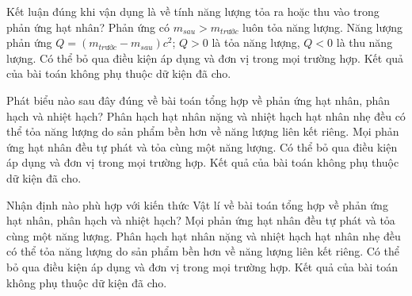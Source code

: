 \begin{ex}
Kết luận đúng khi vận dụng là về tính năng lượng tỏa ra hoặc thu vào trong phản ứng hạt nhân?
\choice
{Phản ứng có $m_{sau}\gt m_{trước}$ luôn tỏa năng lượng.}
{\True Năng lượng phản ứng $Q=(m_{trước}-m_{sau})c^2$; $Q>0$ là tỏa năng lượng, $Q<0$ là thu năng lượng.}
{Có thể bỏ qua điều kiện áp dụng và đơn vị trong mọi trường hợp.}
{Kết quả của bài toán không phụ thuộc dữ kiện đã cho.}
\end{ex}

\begin{ex}
Phát biểu nào sau đây đúng về bài toán tổng hợp về phản ứng hạt nhân, phân hạch và nhiệt hạch?
\choice
{\True Phân hạch hạt nhân nặng và nhiệt hạch hạt nhân nhẹ đều có thể tỏa năng lượng do sản phẩm bền hơn về năng lượng liên kết riêng.}
{Mọi phản ứng hạt nhân đều tự phát và tỏa cùng một năng lượng.}
{Có thể bỏ qua điều kiện áp dụng và đơn vị trong mọi trường hợp.}
{Kết quả của bài toán không phụ thuộc dữ kiện đã cho.}
\end{ex}

\begin{ex}
Nhận định nào phù hợp với kiến thức Vật lí về bài toán tổng hợp về phản ứng hạt nhân, phân hạch và nhiệt hạch?
\choice
{Mọi phản ứng hạt nhân đều tự phát và tỏa cùng một năng lượng.}
{\True Phân hạch hạt nhân nặng và nhiệt hạch hạt nhân nhẹ đều có thể tỏa năng lượng do sản phẩm bền hơn về năng lượng liên kết riêng.}
{Có thể bỏ qua điều kiện áp dụng và đơn vị trong mọi trường hợp.}
{Kết quả của bài toán không phụ thuộc dữ kiện đã cho.}
\end{ex}

